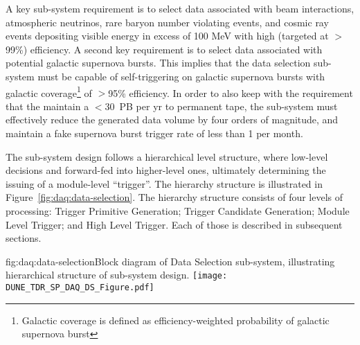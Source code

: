 A key sub-system requirement is to select data associated with beam
interactions, atmospheric neutrinos, rare baryon number violating events,
and cosmic ray events depositing visible energy in excess of 100 MeV
with high (targeted at $>$99\%) efficiency. A second key requirement is to select data
associated with potential galactic supernova bursts. This implies that
the data selection sub-system must be capable of self-triggering on
galactic supernova bursts with galactic coverage\footnote{Galactic
  coverage is defined as efficiency-weighted probability of galactic supernova
burst} of $>$95\% efficiency. In order to also keep with the
requirement that the   maintain a $<$30~PB per yr to permanent
tape, the  sub-system must effectively reduce the generated data
volume by four orders of magnitude, and maintain a fake supernova
burst trigger rate of less than \num{1} per month.

The  sub-system design follows a hierarchical level structure, where low-level
decisions and forward-fed into higher-level ones, ultimately
determining the issuing of a  module-level ``trigger''. The hierarchy
structure is illustrated in Figure~\ref{fig:daq:data-selection}. The hierarchy structure
consists of four levels of processing: Trigger Primitive Generation;
Trigger Candidate Generation; Module Level Trigger; and High Level
Trigger. Each of those is described in subsequent sections.

\begin{dunefigure}{fig:daq:data-selection}{Block diagram of  
    Data Selection sub-system, illustrating hierarchical structure of
    sub-system design.}
  \texttt{[image: DUNE\_TDR\_SP\_DAQ\_DS\_Figure.pdf]}
\end{dunefigure}

